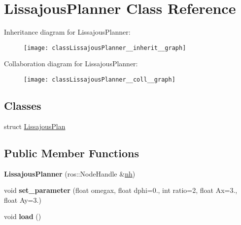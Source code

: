 \hypertarget{classLissajousPlanner}{}\section{Lissajous\+Planner Class Reference}
\label{classLissajousPlanner}


Inheritance diagram for Lissajous\+Planner\+:\nopagebreak
\begin{figure}[H]
\begin{center}
\leavevmode
\texttt{[image: classLissajousPlanner\_\_inherit\_\_graph]}
\end{center}
\end{figure}


Collaboration diagram for Lissajous\+Planner\+:\nopagebreak
\begin{figure}[H]
\begin{center}
\leavevmode
\texttt{[image: classLissajousPlanner\_\_coll\_\_graph]}
\end{center}
\end{figure}
\subsection*{Classes}
\begin{DoxyCompactItemize}
\item 
struct \hyperlink{structLissajousPlanner_1_1LissajousPlan}{Lissajous\+Plan}
\end{DoxyCompactItemize}
\subsection*{Public Member Functions}
\begin{DoxyCompactItemize}
\item 
{\bfseries Lissajous\+Planner} (ros\+::\+Node\+Handle \&\hyperlink{classPlanner_a9714d036f444a07ce90be8d135b9a40c}{nh})\hypertarget{classLissajousPlanner_a82095ebb2cd29944a201321377fc78fe}{}\label{classLissajousPlanner_a82095ebb2cd29944a201321377fc78fe}

\item 
void {\bfseries set\+\_\+parameter} (float omegax, float dphi=0., int ratio=2, float Ax=3., float Ay=3.)\hypertarget{classLissajousPlanner_aa6e4d941a535dca182aaf8b73b5a0dcd}{}\label{classLissajousPlanner_aa6e4d941a535dca182aaf8b73b5a0dcd}

\item 
void {\bfseries load} ()\hypertarget{classLissajousPlanner_ae7ecff9989a37d29e591bac082b781ac}{}\label{classLissajousPlanner_ae7ecff9989a37d29e591bac082b781ac}

\end{DoxyCompactItemize}
